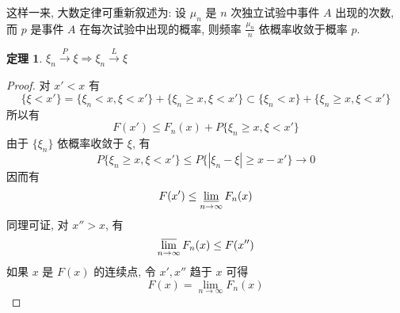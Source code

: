 \documentclass[12pt,a4paper]{article}
\newtheorem{thm}{定理}[subsection]  %
\begin{document}
这样一来, 大数定律可重新叙述为: 设 $\mu_n$ 是 $n$ 次独立试验中事件 $A$ 出现的次数, 而 $p$ 是事件 $A$ 在每次试验中出现的概率, 则频率 $\frac{\mu_n}{n}$ 依概率收敛于概率 $p$.

\begin{thm}
    $\xi_n \overset{P}{\to} \xi \Rightarrow \xi_n \overset{L}{\to} \xi$
\end{thm}

\begin{proof}
    对 $x' < x$ 有
    \[\{\xi < x'\} = \{\xi_n < x, \xi < x'\} + \{\xi_n \geq x, \xi < x'\} \subset \{\xi_n < x\} + \{\xi_n \geq x, \xi < x'\}\]
    所以有\[F(x') \leq F_n(x) + P\{\xi_n \geq x, \xi < x'\}\]
    由于 $\{\xi_n\}$ 依概率收敛于 $\xi$, 有
    \[P\{\xi_n \geq x, \xi<x'\} \leq P\{|\xi_n - \xi| \geq x-x'\} \to 0\]
    因而有 \[F(x') \leq \varliminf\limits_{n \to \infty} F_n(x) \]
    同理可证, 对 $x'' > x$, 有
    \[\varlimsup\limits_{n \to \infty} F_n(x) \leq F(x'')\]
    如果 $x$ 是 $F(x)$ 的连续点, 令 $x',x''$ 趋于 $x$ 可得
    \[F(x) = \lim\limits_{n \to \infty} F_n(x)\]
\end{proof}
\end{document}
